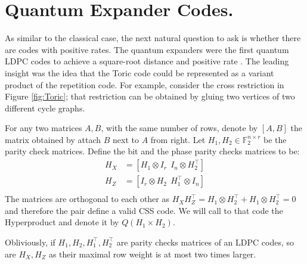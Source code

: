 %
 
\section{Quantum Expander Codes.}
As similar to the classical case, the next natural question to ask is whether there are codes with positive rates. The quantum expanders were the first quantum LDPC codes to achieve a square-root distance and positive rate \cite{Tillich_2014, Leverrier_2015}. The leading insight was the idea that the Toric code could be represented as a variant product of the repetition code. For example, consider the cross restriction in Figure \cref{fig:Toric}; that restriction can be obtained by gluing two vertices of two different cycle graphs.

\begin{definition}
  For any two matrices $A,B$, with the same number of rows, denote by $\left[ A,B \right]$ the matrix obtained by attach $B$ next to $A$ from right.  Let $H_{1}, H_{2} \in \mathbb{F}_{2}^{n\times r}$ be the parity check matrices. Define the bit and the phase parity checks matrices to be:          
\begin{equation*}
  \begin{split}
    H_{X} &= \left[ H_{1} \otimes I_{r} \ \  I_{n} \otimes H^{\top}_{2} \right] \\ 
    H_{Z} &= \left[ I_{r} \otimes H_{2} \ \  H_{1}^{\top} \otimes I_{n} \right] \\ 
  \end{split}
  \label{equ:css}
\end{equation*}
The matrices are orthogonal to each other as $H_{X}H_{Z}^{\top} = H_{1}\otimes H^{\top}_{2} + H_{1}\otimes H^{\top}_{2} = 0$ and therefore the pair define a valid CSS code. We will call to that code the Hyperproduct and denote it by $Q\left( H_{1} \times H_{2} \right)$.
\end{definition}
Obliviously, if $H_{1},H_{2},H_{1}^{\top},H_{2}^{\top}$ are parity checks matrices of an LDPC codes, so are $H_{X},H_{Z}$ as their maximal row weight is at most two times larger.   

